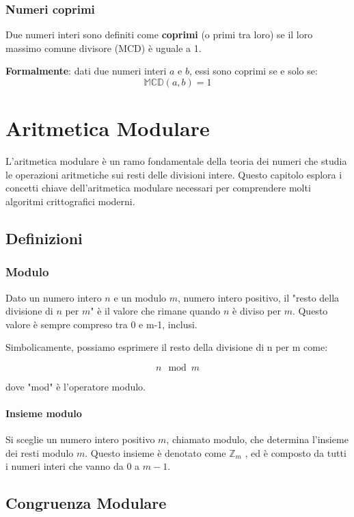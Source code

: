 \documentclass[a4paper,12pt]{report}
\begin{document}
\subsection*{Numeri coprimi}
Due numeri interi sono definiti come \textbf{coprimi} (o primi tra loro) se il loro massimo comune divisore (MCD) è uguale a 1. 

\textbf{Formalmente}: dati due numeri interi \(a\) e \(b\), essi sono coprimi se e solo se:
\[\mathbb{MCD}(a, b) = 1\]

\chapter{Aritmetica Modulare}

L'aritmetica modulare è un ramo fondamentale della teoria dei numeri che studia le operazioni aritmetiche sui resti delle divisioni intere. Questo capitolo esplora i concetti chiave dell'aritmetica modulare necessari per comprendere molti algoritmi crittografici moderni.

\section{Definizioni}
\subsection*{Modulo} 
Dato un numero intero $n$ e un modulo $m$, numero intero positivo, il "resto della divisione di $n$ per $m$" è il valore che rimane quando $n$ è diviso per $m$. Questo valore è sempre compreso tra 0 e m-1, inclusi.

Simbolicamente, possiamo esprimere il resto della divisione di n per m come:

\[ n \mod m \]

dove "mod" è l'operatore modulo.

\subsubsection*{Insieme modulo}
Si sceglie un numero intero positivo \(m\), chiamato modulo, che determina l'insieme dei resti modulo \(m\). 
Questo insieme è denotato come \(\mathbb{Z}_m\)  , ed è composto da tutti i numeri interi che vanno da 0 a \(m-1\).

\section{Congruenza Modulare}
\end{document}
